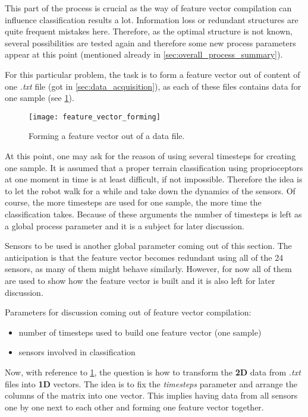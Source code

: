This part of the process is crucial as the way of feature vector compilation can influence classification results a lot. Information loss or redundant structures are quite frequent mistakes here. Therefore, as the optimal structure is not known, several possibilities are tested again and therefore some new process parameters appear at this point (mentioned already in \cref{sec:overall_process_summary}).

For this particular problem, the task is to form a feature vector out of content of one \textit{.txt} file (got in \cref{sec:data_acquisition}), as each of these files contains data for one sample (see \cref{img:feature_vector_forming}).

\begin{figure}[H]
  \centering
  \texttt{[image: feature\_vector\_forming]}
  \caption{Forming a feature vector out of a data file.}
  \label{img:feature_vector_forming}
\end{figure}

At this point, one may ask for the reason of using several timesteps for creating one sample. It is assumed that a proper terrain classification using proprioceptors at one moment in time is at least difficult, if not impossible. Therefore the idea is to let the robot walk for a while and take down the dynamics of the sensors. Of course, the more timesteps are used for one sample, the more time the classification takes. Because of these arguments the number of timesteps is left as a global process parameter and it is a subject for later discussion.

Sensors to be used is another global parameter coming out of this section. The anticipation is that the feature vector becomes redundant using all of the 24 sensors, as many of them might behave similarly. However, for now all of them are used to show how the feature vector is built and it is also left for later discussion.

Parameters for discussion coming out of feature vector compilation:
\begin{itemize}
\item number of timesteps used to build one feature vector (one sample)
\item sensors involved in classification
\end{itemize}

Now, with reference to \cref{img:feature_vector_forming}, the question is how to transform the \textbf{2D} data from \textit{.txt} files into \textbf{1D} vectors. The idea is to fix the \textit{timesteps} parameter and arrange the columns of the matrix into one vector. This implies having data from all sensors one by one next to each other and forming one feature vector together. 

